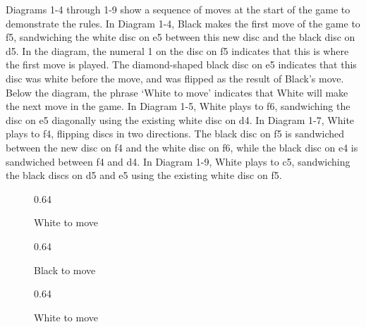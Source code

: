 \documentclass[a4paper,12pt]{book}
\newcommand{\scalefactorthreeup}{0.64}
\begin{document}
Diagrams 1-4 through 1-9 show a sequence of moves at the start of the game to
demonstrate the rules. In Diagram 1-4, Black makes the first move of the game to
f5, sandwiching the white disc on e5 between this new disc and the black disc on
d5. In the diagram, the numeral 1 on the disc on f5 indicates that this is where the
first move is played. The diamond-shaped black disc on e5 indicates that this disc
was white before the move, and was flipped as the result of Black's move. Below
the diagram, the phrase `White to move' indicates that White will make the next
move in the game. In Diagram 1-5, White plays to f6, sandwiching the disc on e5
diagonally using the existing white disc on d4. In Diagram 1-7, White plays to f4,
flipping discs in two directions. The black disc on f5 is sandwiched between the
new disc on f4 and the white disc on f6, while the black disc on e4 is sandwiched
between f4 and d4. In Diagram 1-9, White plays to c5, sandwiching the black discs
on d5 and e5 using the existing white disc on f5.
\begin{figure}[h]
\begin{center}
\begin{minipage}[t]{.32\textwidth}
\begin{othelloboard}{\scalefactorthreeup}
\dotmarkings
{}
\end{othelloboard}
\caption{White to move}
\end{minipage}
\hfill
\begin{minipage}[t]{.32\textwidth}
\begin{othelloboard}{\scalefactorthreeup}
\end{othelloboard}
\caption{Black to move}
\end{minipage}
\hfill
\begin{minipage}[t]{.32\textwidth}
\begin{othelloboard}{\scalefactorthreeup}
\end{othelloboard}
\caption{White to move}
\end{minipage}
\end{center}
\end{figure}
 
\end{document}
